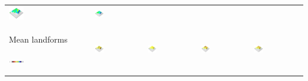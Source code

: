 \documentclass[prodmode,acmtochi]{acmsmall} %
\begin{document}
\begin{table}
{\begin{tabular}{m{} m{} m{} m{} m{}}
\includegraphics[width=0.19\textwidth]{images/render_3d/mean_slope_2.png} &
\includegraphics[width=0.19\textwidth]{images/render_3d/mean_slope_3.png}\\
%
Mean landforms \par \vspace{0.5em} \includegraphics[width=0.19\textwidth]{images/legends/forms_legend.pdf} & 
\includegraphics[width=0.19\textwidth]{images/render_3d/forms_1.png} &
\includegraphics[width=0.19\textwidth]{images/render_3d/mean_forms_1.png} &
\includegraphics[width=0.19\textwidth]{images/render_3d/mean_forms_2.png} &
\includegraphics[width=0.19\textwidth]{images/render_3d/mean_forms_3.png}\\
%
\bottomrule
\end{tabular}}
\label{table:coupling_experiment} 
\end{table}
%
\end{document}
